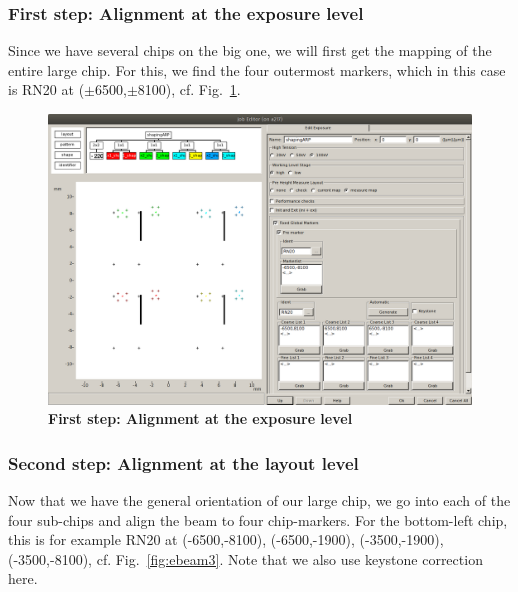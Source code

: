 \subsubsection{First step: Alignment at the exposure level}
%
Since we have several chips on the big one, we will first get the mapping of the entire large chip. 
%
For this, we find the four outermost markers, which in this case is RN20 at ($\pm$6500,$\pm$8100), cf. Fig.~\ref{fig:ebeam2}.

\begin{figure}
	\centering
	\includegraphics[width=\linewidth]{appendix/figs/ebeam2}
	\caption{\textbf{First step: Alignment at the exposure level}}
	\label{fig:ebeam2}
\end{figure}

\subsubsection{Second step: Alignment at the layout level}
%
Now that we have the general orientation of our large chip, we go into each of the four sub-chips and align the beam to four chip-markers. 
%
For the bottom-left chip, this is for example RN20 at (-6500,-8100), (-6500,-1900), (-3500,-1900), (-3500,-8100), cf. Fig.~\ref{fig:ebeam3}.
%
Note that we also use keystone correction here.

